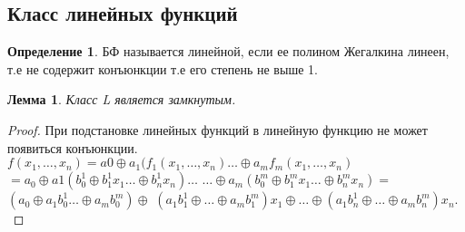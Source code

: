 \documentclass[a4paper]{article}
\newtheorem{lemma}{Лемма}[section]
\theoremstyle{definition}
\newtheorem*{definition}{Определение}
\theoremstyle{remark}
\begin{document}
    \subsection{Класс линейных функций}
    \begin{definition}
        БФ называется линейной, если ее полином Жегалкина линеен, т.е не содержит конъюнкции т.е
        его степень не выше 1.
    \end{definition}
    \begin{lemma}
        Класс L является замкнутым.
    \end{lemma}
    \begin{proof}
        При подстановке линейных функций в линейную функцию не может появиться конъюнкции. 
        $f(x_1, \dots, x_n)= a0 \oplus a_1(f_1(x_1, \dots, x_n) \dots \oplus a_m f_m(x_1, \dots, x_n)$
        $=a_0 \oplus a1(b_0^1 \oplus b_1^1 x_1 \dots \oplus b_n^1 x_n)  \dots$
        $\dots \oplus  a_m(b_0^m \oplus b_1^m x_1 \dots \oplus b_n^m x_n)=$
        $(a_0 \oplus  a_1b_0^1  \dots \oplus  a_m b_0^m) \oplus$
        $(a_1b_1^1 \oplus  \dots \oplus  a_m b_1^m)x_1 \oplus\dots  \oplus (a_1b_n^1 \oplus  \dots  \oplus  a_m b_n^m)x_n.$
    \end{proof} 
\end{document}
